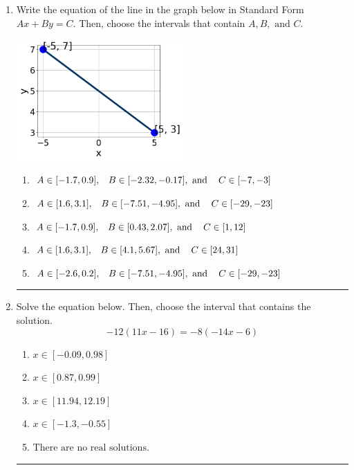 \documentclass[14pt]{extbook}
\newcommand{\litem}[1]{\item#1\hspace*{-1cm}\rule{\textwidth}{0.4pt}}
\begin{document}
\begin{enumerate}
{\begin{enumerate}[label=\Alph*.]
\end{enumerate} }
\litem{
Write the equation of the line in the graph below in Standard Form $Ax+By=C$. Then, choose the intervals that contain $A, B, \text{ and } C$.
\begin{center}
    \includegraphics[width=0.5\textwidth]{../Figures/linearGraphToStandardA.png}
\end{center}
\begin{enumerate}[label=\Alph*.]
\item \( A \in [-1.7, 0.9], \hspace{3mm} B \in [-2.32, -0.17], \text{ and } \hspace{3mm} C \in [-7, -3] \)
\item \( A \in [1.6, 3.1], \hspace{3mm} B \in [-7.51, -4.95], \text{ and } \hspace{3mm} C \in [-29, -23] \)
\item \( A \in [-1.7, 0.9], \hspace{3mm} B \in [0.43, 2.07], \text{ and } \hspace{3mm} C \in [1, 12] \)
\item \( A \in [1.6, 3.1], \hspace{3mm} B \in [4.1, 5.67], \text{ and } \hspace{3mm} C \in [24, 31] \)
\item \( A \in [-2.6, 0.2], \hspace{3mm} B \in [-7.51, -4.95], \text{ and } \hspace{3mm} C \in [-29, -23] \)

\end{enumerate} }
\litem{
Solve the equation below. Then, choose the interval that contains the solution.\[ -12(11x -16) = -8(-14x -6) \]\begin{enumerate}[label=\Alph*.]
\item \( x \in [-0.09, 0.98] \)
\item \( x \in [0.87, 0.99] \)
\item \( x \in [11.94, 12.19] \)
\item \( x \in [-1.3, -0.55] \)
\item \( \text{There are no real solutions.} \)


\end{enumerate}}
\end{enumerate}
\end{document}
